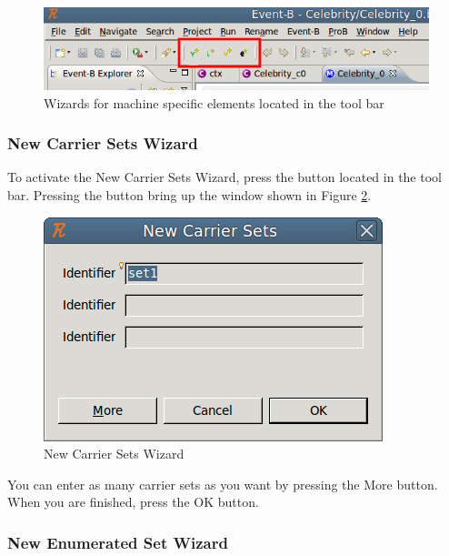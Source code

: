\begin{figure}[!ht]
\begin{center}
	\includegraphics{img/reference/ref_01_eventb_editor13.png}
	\caption{Wizards for machine specific elements located in the tool bar}
	\label{fig_ref_01_eventb_editor13}
\end{center}
\end{figure}


\subsubsection{New Carrier Sets Wizard}

To activate the \textsf{New Carrier Sets Wizard}, press the  button located in the tool bar. Pressing the button bring up the window shown in Figure \ref{fig_ref_01_eventb_editor4}.

\begin{figure}[!ht]
\begin{center}
	\includegraphics{img/reference/ref_01_eventb_editor4.png}
	\caption{New Carrier Sets Wizard}
	\label{fig_ref_01_eventb_editor4}
\end{center}
\end{figure}

You can enter as many carrier sets as you want by pressing the \textsf{More} button. When you are finished, press the \textsf{OK} button. 

\subsubsection{New Enumerated Set Wizard}
\label{enumerated_set_wizard}

